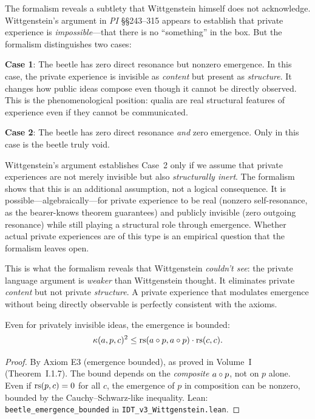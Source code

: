 \begin{interpretation}
\label{interp:disagree-wittgenstein-pla}
The formalism reveals a subtlety that Wittgenstein himself does not
acknowledge. Wittgenstein's argument in \textit{PI} \S\S243--315 appears to
establish that private experience is \emph{impossible}---that there is no
``something'' in the box. But the formalism distinguishes two cases:

\textbf{Case 1}: The beetle has zero direct resonance but nonzero emergence.
In this case, the private experience is invisible as \emph{content} but present
as \emph{structure}. It changes how public ideas compose even though it cannot
be directly observed. This is the phenomenological position: qualia are real
structural features of experience even if they cannot be communicated.

\textbf{Case 2}: The beetle has zero direct resonance \emph{and} zero
emergence. Only in this case is the beetle truly void.

Wittgenstein's argument establishes Case~2 only if we assume that private
experiences are not merely invisible but also \emph{structurally inert}. The
formalism shows that this is an additional assumption, not a logical
consequence. It is possible---algebraically---for private experience to be
real (nonzero self-resonance, as the bearer-knows theorem guarantees) and
publicly invisible (zero outgoing resonance) while still playing a structural
role through emergence. Whether actual private experiences are of this type
is an empirical question that the formalism leaves open.

This is what the formalism reveals that Wittgenstein \emph{couldn't see}:
the private language argument is \emph{weaker} than Wittgenstein thought.
It eliminates private \emph{content} but not private \emph{structure}.
A private experience that modulates emergence without being directly observable
is perfectly consistent with the axioms.
\end{interpretation}

\begin{theorem}
\label{thm:emergence-bound-private}
Even for privately invisible ideas, the emergence is bounded:
\[
\kappa(a, p, c)^2 \leq \mathrm{rs}(a \circ p, a \circ p) \cdot \mathrm{rs}(c, c).
\]
\end{theorem}

\begin{proof}
By Axiom E3 (emergence bounded), as proved in Volume~I (Theorem~I.1.7).
The bound depends on the \emph{composite} $a \circ p$, not on $p$ alone.
Even if $\mathrm{rs}(p, c) = 0$ for all $c$, the emergence of $p$ in composition
can be nonzero, bounded by the Cauchy--Schwarz-like inequality.
Lean: \texttt{beetle\_emergence\_bounded} in \texttt{IDT\_v3\_Wittgenstein.lean}.
\end{proof}

